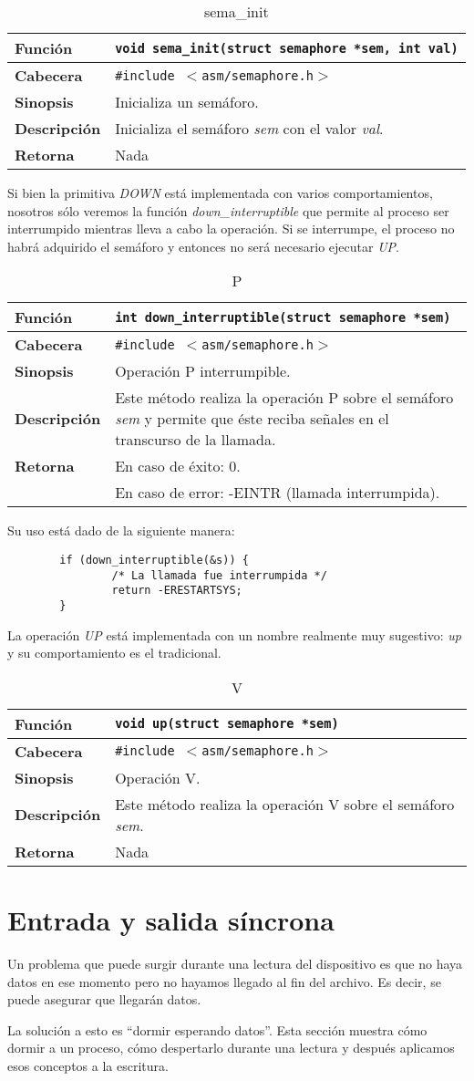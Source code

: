 \documentclass[12pt,a4paper,spanish]{article}
\newenvironment{funcdesc}[1]
	{	
		\begin{table}[!htp]
		\caption{ {#1} }
		\begin{small}
		\begin{tabular}{ | l | p{10cm} | } \hline
	}
	{
		\end{tabular}
		\end{small}
		\end{table}
	}
\newcommand{\funcion}[1] {\textbf {Función} &  \texttt{{#1}} \\ \hline}
\newcommand{\cabecera}[1] {\textbf {Cabecera} &  \texttt{\#include $<${#1}$>$} \\ \hline}
\newcommand{\sinopsis}[1] {\textbf {Sinopsis} &  {#1} \\ \hline}
\newcommand{\descrip}[1] {\textbf {Descripción} &  {#1} \\ \hline}
\newcommand{\return}[2]{ \textbf{Retorna} & En caso de éxito: {#1} \\ & En caso de error: {#2} \\ \hline }
\newcommand{\returnNada}[0]{ \textbf{Retorna} & Nada \\ \hline }
\begin{document}
\begin{funcdesc}{sema\_init}
\funcion{void sema\_init(struct semaphore *sem, int val)}
\cabecera{asm/semaphore.h}
\sinopsis{Inicializa un semáforo.}
\descrip{Inicializa el semáforo \textit{sem} con el valor \textit{val}. }
\returnNada
\end{funcdesc}

Si bien la primitiva \textit{DOWN} está implementada con varios comportamientos, nosotros sólo veremos la función \textit{down\_interruptible} que permite al proceso ser interrumpido mientras lleva a cabo la operación. Si se interrumpe, el proceso no habrá adquirido el semáforo y entonces no será necesario ejecutar \textit{UP}.

\begin{funcdesc}{P}
\funcion{int down\_interruptible(struct semaphore *sem)}
\cabecera{asm/semaphore.h}
\sinopsis{Operación P interrumpible.}
\descrip{Este método realiza la operación P sobre el semáforo \textit{sem} y permite que éste reciba señales en el transcurso de la llamada. }
\return{0.}{-EINTR (llamada interrumpida).}
\end{funcdesc}

Su uso está dado de la siguiente manera:

\begin{verbatim}
        if (down_interruptible(&s)) {
                /* La llamada fue interrumpida */
                return -ERESTARTSYS;
        }
\end{verbatim} 

La operación \textit{UP} está implementada con un nombre realmente muy sugestivo: \textit{up} y su comportamiento es el tradicional.
\begin{funcdesc}{V}
\funcion{void up(struct semaphore *sem)}
\cabecera{asm/semaphore.h}
\sinopsis{Operación V.}
\descrip{Este método realiza la operación V sobre el semáforo \textit{sem}. }
\returnNada
\end{funcdesc}

\section{Entrada y salida síncrona}

Un problema que puede surgir durante una lectura del dispositivo es que no haya datos en ese momento pero no hayamos llegado al fin del archivo. Es decir, se puede asegurar que llegarán datos.

La solución a esto es ``dormir esperando datos''. Esta sección muestra cómo dormir a un proceso, cómo despertarlo durante una lectura y después aplicamos esos conceptos a la escritura.
\end{document}

